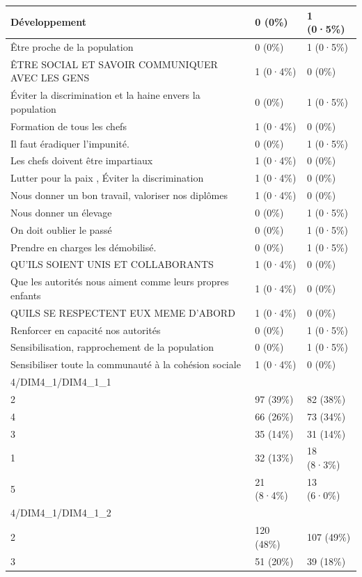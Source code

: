 \documentclass[
]{book}
\begin{document}
\begin{tabular}{l|l|l}
\hline
Développement & 0 (0\%) & 1 (0·5\%)\\
\hline
Être proche de la population & 0 (0\%) & 1 (0·5\%)\\
\hline
ÊTRE SOCIAL ET SAVOIR COMMUNIQUER AVEC LES GENS & 1 (0·4\%) & 0 (0\%)\\
\hline
Éviter la discrimination et la haine envers la population & 0 (0\%) & 1 (0·5\%)\\
\hline
Formation de tous les chefs & 1 (0·4\%) & 0 (0\%)\\
\hline
Il faut éradiquer l'impunité. & 0 (0\%) & 1 (0·5\%)\\
\hline
Les chefs doivent être impartiaux & 1 (0·4\%) & 0 (0\%)\\
\hline
Lutter pour la paix , Éviter la discrimination & 1 (0·4\%) & 0 (0\%)\\
\hline
Nous donner un bon travail, valoriser nos diplômes & 1 (0·4\%) & 0 (0\%)\\
\hline
Nous donner un élevage & 0 (0\%) & 1 (0·5\%)\\
\hline
On doit oublier le passé & 0 (0\%) & 1 (0·5\%)\\
\hline
Prendre en charges les  démobilisé. & 0 (0\%) & 1 (0·5\%)\\
\hline
QU'ILS SOIENT UNIS ET COLLABORANTS & 1 (0·4\%) & 0 (0\%)\\
\hline
Que les autorités nous aiment comme leurs propres enfants & 1 (0·4\%) & 0 (0\%)\\
\hline
QUILS SE RESPECTENT EUX MEME D'ABORD & 1 (0·4\%) & 0 (0\%)\\
\hline
Renforcer en capacité nos autorités & 0 (0\%) & 1 (0·5\%)\\
\hline
Sensibilisation, rapprochement de la population & 0 (0\%) & 1 (0·5\%)\\
\hline
Sensibiliser toute la communauté à la cohésion sociale & 1 (0·4\%) & 0 (0\%)\\
\hline
4/DIM4\_1/DIM4\_1\_1 &  & \\
\hline
2 & 97 (39\%) & 82 (38\%)\\
\hline
4 & 66 (26\%) & 73 (34\%)\\
\hline
3 & 35 (14\%) & 31 (14\%)\\
\hline
1 & 32 (13\%) & 18 (8·3\%)\\
\hline
5 & 21 (8·4\%) & 13 (6·0\%)\\
\hline
4/DIM4\_1/DIM4\_1\_2 &  & \\
\hline
2 & 120 (48\%) & 107 (49\%)\\
\hline
3 & 51 (20\%) & 39 (18\%)\\

\end{tabular}
\end{document}
